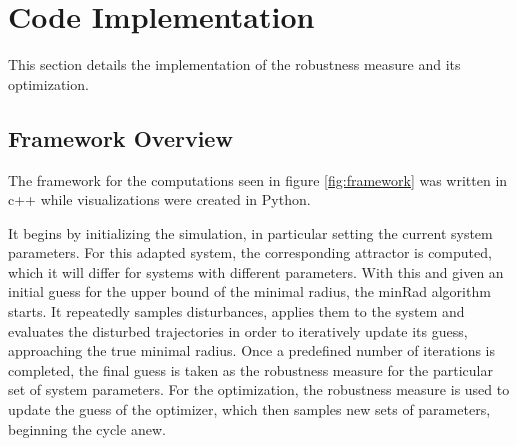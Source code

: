 



    


\section{Code Implementation} \label{codeimplementation}

This section details the implementation of the robustness measure and its optimization. 

\subsection{Framework Overview} \label{framework}

The framework for the computations seen in figure \ref{fig:framework} was written in c++ while visualizations were created in Python.  

It begins by initializing the simulation, in particular setting the current system parameters. For this adapted system, the corresponding attractor is computed, which it will differ for systems with different parameters. With this and given an initial guess for the upper bound of the minimal radius, the minRad algorithm starts. It repeatedly samples disturbances, applies them to the system and evaluates the disturbed trajectories in order to iteratively update its guess, approaching the true minimal radius. Once a predefined number of iterations is completed, the final guess is taken as the robustness measure for the particular set of system parameters. For the optimization, the robustness measure is used to update the guess of the optimizer, which then samples new sets of parameters, beginning the cycle anew. 


